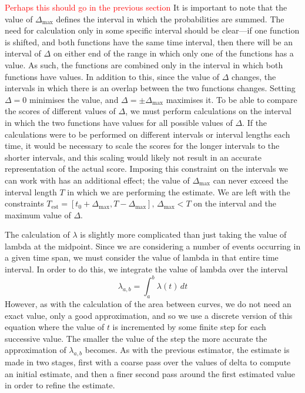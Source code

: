 \documentclass[a4paper,11pt]{article}
\begin{document}
   \textcolor{red}{Perhaps this should go in the previous section} It is important
   to note that the value of $\Delta_{\text{max}}$ defines the interval in which
   the probabilities are summed. The need for calculation only in some specific
   interval should be clear---if one function is shifted, and both functions have
   the same time interval, then there will be an interval of $\Delta$ on either end
   of the range in which only one of the functions has a value. As such, the
   functions are combined only in the interval in which both functions have
   values. In addition to this, since the value of $\Delta$ changes, the intervals
   in which there is an overlap between the two functions changes. Setting
   $\Delta=0$ minimises the value, and $\Delta=\pm\Delta_{\text{max}}$ maximises
   it. To be able to compare the scores of different values of $\Delta$, we must
   perform calculations on the interval in which the two functions have values for
   all possible values of $\Delta$. If the calculations were to be performed on
   different intervals or interval lengths each time, it would be necessary to
   scale the scores for the longer intervals to the shorter intervals, and this
   scaling would likely not result in an accurate representation of the actual
   score. Imposing this constraint on the intervals we can work with has an
   additional effect; the value of $\Delta_{\text{max}}$ can never exceed the
   interval length $T$ in which we are performing the estimate. We are left with
   the constraints $T_{\text{est}}=[t_0+\Delta_{\text{max}},
   T-\Delta_{\text{max}}],\,\Delta_{\text{max}}<T$ on the interval and the maximum
   value of $\Delta$.

   The calculation of $\lambda$ is slightly more complicated than just taking the
   value of lambda at the midpoint. Since we are considering a number of events
   occurring in a given time span, we must consider the value of lambda in that
   entire time interval. In order to do this, we integrate the value of lambda over
   the interval
   \begin{equation}
   \lambda_{a,b}=\int_a^b\lambda(t)\,dt
   \end{equation}
   However, as with the calculation of the area between curves, we do not need an
   exact value, only a good approximation, and so we use a discrete version of this
   equation where the value of $t$ is incremented by some finite step for each successive
   value. The smaller the value of the step the more accurate the approximation of
   $\lambda_{a,b}$ becomes. As with the previous estimator, the estimate is made in
   two stages, first with a coarse pass over the values of delta to compute an
   initial estimate, and then a finer second pass around the first estimated value
   in order to refine the estimate.
\end{document}
